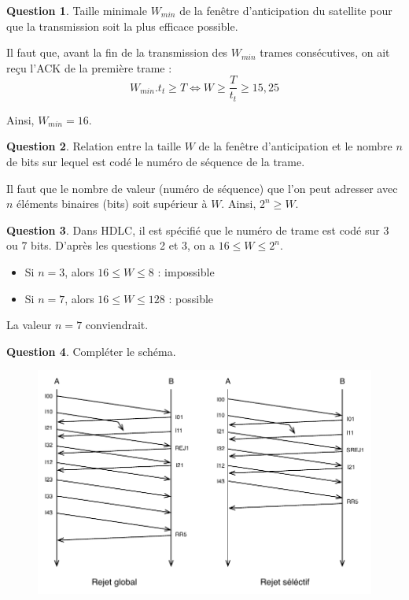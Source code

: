 \documentclass[11pt,english,french]{scrreprt}
\theoremstyle{remark}
\theoremstyle{definition}
\newtheorem{ques}{Question}[section]
\begin{document}
\begin{ques}
	Taille minimale $W_{min}$ de la fenêtre d'anticipation du satellite pour que la transmission soit la plus efficace possible.
	
	Il faut que, avant la fin de la transmission des $W_{min}$ trames consécutives, on ait reçu l'ACK de la première trame :\[W_{min}.t_t \geqslant T\Leftrightarrow W\geqslant \frac{T}{t_t} \geqslant 15,25\]
	
	Ainsi, $W_{min} = 16$. 
\end{ques}

\begin{ques}
	Relation entre la taille $W$ de la fenêtre d'anticipation et le nombre $n$ de bits sur lequel est codé le numéro de séquence de la trame.
	
	Il faut que le nombre de valeur (numéro de séquence) que l'on peut adresser avec $n$ éléments binaires (bits) soit supérieur à $W$. Ainsi, $2^n\geqslant W$.
\end{ques}

\begin{ques}
	Dans HDLC, il est spécifié que le numéro de trame est codé sur 3 ou 7 bits. D'après les questions 2 et 3, on a $16 \leqslant W\leqslant 2^n$.\begin{itemize}
		\item Si $n=3$, alors $16\leqslant W\leqslant 8$ : impossible
		\item Si $n=7$, alors $16\leqslant W\leqslant 128$ : possible
	\end{itemize}
	La valeur $n=7$ conviendrait.
\end{ques}

\begin{ques}
	Compléter le schéma.
	
	\begin{figure}[h!]
		\center
		\includegraphics[scale=.8]{Exam2009/echange-hdlc}
	\end{figure}
\end{ques}
\end{document}
